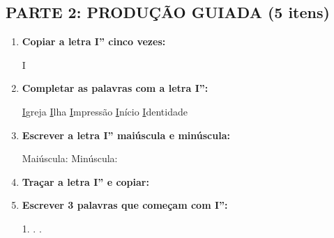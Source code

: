 \begin{exercicio}
\subsection*{PARTE 2: PRODUÇÃO GUIADA (5 itens)}

\begin{enumerate}[resume]
  \item \textbf{Copiar a letra I'' cinco vezes:}
  \begin{center}
  I \quad \underline{\hspace{1.5cm}} \quad \underline{\hspace{1.5cm}} \quad \underline{\hspace{1.5cm}} \quad \underline{\hspace{1.5cm}} \quad \underline{\hspace{1.5cm}}
  \end{center}

  \item \textbf{Completar as palavras com a letra I'':}
  \begin{center}
  \underline{I}greja \quad \underline{I}lha \quad \underline{I}mpressão \quad \underline{I}nício \quad \underline{I}dentidade
  \end{center}

  \item \textbf{Escrever a letra I'' maiúscula e minúscula:}
  \begin{center}
  Maiúscula: \underline{\hspace{2cm}} \quad Minúscula: \underline{\hspace{2cm}}
  \end{center}

  \item \textbf{Traçar a letra I'' e copiar:}
  \begin{center}
  \end{center}

  \item \textbf{Escrever 3 palavras que começam com I'':}
  \begin{center}
  1. \underline{\hspace{3cm}} . \underline{\hspace{3cm}} . \underline{\hspace{3cm}}
  \end{center}
\end{enumerate}


\end{exercicio}
